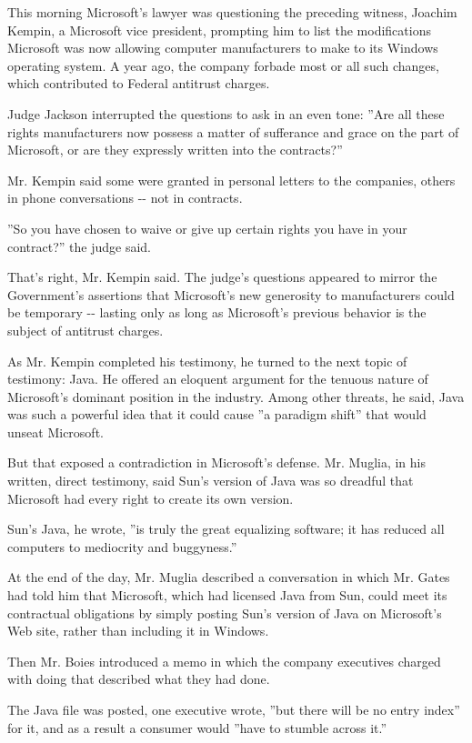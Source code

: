 This morning Microsoft's lawyer was questioning the preceding witness,
Joachim Kempin, a Microsoft vice president, prompting him to list the
modifications Microsoft was now allowing computer manufacturers to make
to its Windows operating system. A year ago, the company forbade most or
all such changes, which contributed to Federal antitrust charges.

Judge Jackson interrupted the questions to ask in an even tone: ''Are
all these rights manufacturers now possess a matter of sufferance and
grace on the part of Microsoft, or are they expressly written into the
contracts?''

Mr. Kempin said some were granted in personal letters to the companies,
others in phone conversations -\/- not in contracts.

''So you have chosen to waive or give up certain rights you have in your
contract?'' the judge said.

That's right, Mr. Kempin said. The judge's questions appeared to mirror
the Government's assertions that Microsoft's new generosity to
manufacturers could be temporary -\/- lasting only as long as
Microsoft's previous behavior is the subject of antitrust charges.

As Mr. Kempin completed his testimony, he turned to the next topic of
testimony: Java. He offered an eloquent argument for the tenuous nature
of Microsoft's dominant position in the industry. Among other threats,
he said, Java was such a powerful idea that it could cause ''a paradigm
shift'' that would unseat Microsoft.

But that exposed a contradiction in Microsoft's defense. Mr. Muglia, in
his written, direct testimony, said Sun's version of Java was so
dreadful that Microsoft had every right to create its own version.

Sun's Java, he wrote, ''is truly the great equalizing software; it has
reduced all computers to mediocrity and buggyness.''

At the end of the day, Mr. Muglia described a conversation in which Mr.
Gates had told him that Microsoft, which had licensed Java from Sun,
could meet its contractual obligations by simply posting Sun's version
of Java on Microsoft's Web site, rather than including it in Windows.

Then Mr. Boies introduced a memo in which the company executives charged
with doing that described what they had done.

The Java file was posted, one executive wrote, ''but there will be no
entry index'' for it, and as a result a consumer would ''have to stumble
across it.''

